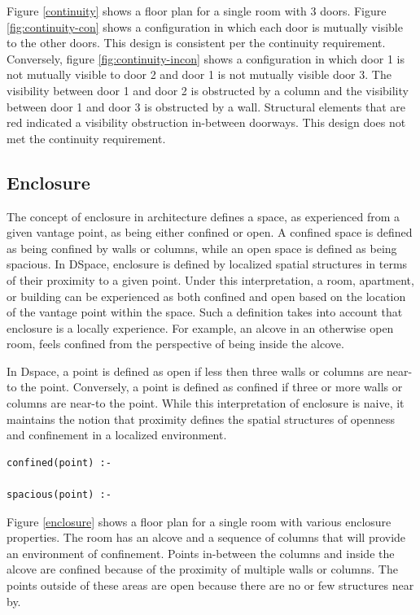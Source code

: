 \documentclass[12pt]{ucthesis}
\begin{document}
Figure \ref{continuity} shows a floor plan for a single room with 3 doors. Figure \ref{fig:continuity-con} shows a configuration in which each door is mutually visible to the other doors. This design is consistent per the continuity requirement. Conversely, figure \ref{fig:continuity-incon} shows a configuration in which door 1 is not mutually visible to door 2 and door 1 is not mutually visible door 3. The visibility between door 1 and door 2 is obstructed by a column and the visibility between door 1 and door 3 is obstructed by a wall. Structural elements that are red indicated a visibility obstruction in-between doorways. This design does not met the continuity requirement. 


\subsection{Enclosure} 
The concept of enclosure in architecture defines a space, as experienced from a given vantage point, as being either confined or open. A confined space is defined as being confined by walls or columns, while an open space is defined as being spacious. In DSpace, enclosure is defined by localized spatial structures in terms of their proximity to a given point. Under this interpretation, a room, apartment, or building can be experienced as both confined and open based on the location of the vantage point within the space. Such a definition takes into account that enclosure is a locally experience. For example, an alcove in an otherwise open room, feels confined from the perspective of being inside the alcove.

In Dspace, a point is defined as open if less then three walls or columns are near-to the point. Conversely, a point is defined as confined if three or more walls or columns are near-to the point. While this interpretation of enclosure is naive, it maintains the notion that proximity defines the spatial structures of openness and confinement in a localized environment.   


\begin{verbatim}
confined(point) :-  

spacious(point) :-

\end{verbatim} 


Figure \ref{enclosure} shows a floor plan for a single room with various enclosure properties. The room has an alcove and a sequence of columns that will provide an environment of confinement. Points in-between the columns and inside the alcove are confined because of the proximity of multiple walls or columns. The points outside of these areas are open because there are no or few structures near by.
\end{document}
